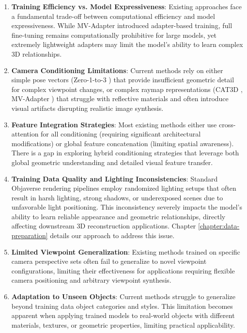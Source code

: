 \begin{enumerate}
  \item \textbf{Training Efficiency vs. Model Expressiveness}: Existing approaches face a fundamental trade-off between computational efficiency and model expressiveness. While MV-Adapter \cite{mvadapter} introduced adapter-based training, full fine-tuning remains computationally prohibitive for large models, yet extremely lightweight adapters may limit the model's ability to learn complex 3D relationships.

  \item \textbf{Camera Conditioning Limitations}: Current methods rely on either simple pose vectors (Zero-1-to-3 \cite{zero1to3}) that provide insufficient geometric detail for complex viewpoint changes, or complex raymap representations (CAT3D \cite{cat3d}, MV-Adapter \cite{mvadapter}) that struggle with reflective materials and often introduce visual artifacts disrupting realistic image synthesis.

  \item \textbf{Feature Integration Strategies}: Most existing methods either use cross-attention for all conditioning (requiring significant architectural modifications) or global feature concatenation (limiting spatial awareness). There is a gap in exploring hybrid conditioning strategies that leverage both global geometric understanding and detailed visual feature transfer.

  \item \textbf{Training Data Quality and Lighting Inconsistencies}: Standard Objaverse rendering pipelines employ randomized lighting setups that often result in harsh lighting, strong shadows, or underexposed scenes due to unfavorable light positioning. This inconsistency severely impacts the model's ability to learn reliable appearance and geometric relationships, directly affecting downstream 3D reconstruction applications. Chapter \ref{chapter:data-preparation} details our approach to address this issue.

  \item \textbf{Limited Viewpoint Generalization}: Existing methods trained on specific camera perspective sets often fail to generalize to novel viewpoint configurations, limiting their effectiveness for applications requiring flexible camera positioning and arbitrary viewpoint synthesis.

  \item \textbf{Adaptation to Unseen Objects}: Current methods struggle to generalize beyond training data object categories and styles. This limitation becomes apparent when applying trained models to real-world objects with different materials, textures, or geometric properties, limiting practical applicability.

\end{enumerate}

